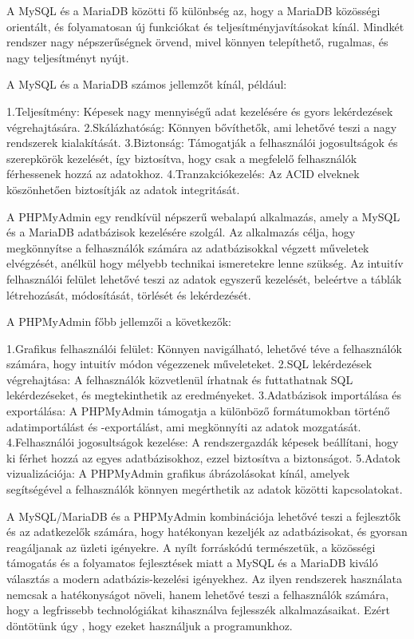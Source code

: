 \documentclass[colorlinks]{thesis-kando}
\theoremstyle{definition}
\theoremstyle{remark}
\begin{document}
A MySQL és a MariaDB közötti fő különbség az, hogy a MariaDB közösségi orientált, és folyamatosan új funkciókat és teljesítményjavításokat kínál. Mindkét rendszer nagy népszerűségnek örvend, mivel könnyen telepíthető, rugalmas, és nagy teljesítményt nyújt.

A MySQL és a MariaDB számos jellemzőt kínál, például:

1.Teljesítmény: Képesek nagy mennyiségű adat kezelésére és gyors lekérdezések végrehajtására.
2.Skálázhatóság: Könnyen bővíthetők, ami lehetővé teszi a nagy rendszerek kialakítását.
3.Biztonság: Támogatják a felhasználói jogosultságok és szerepkörök kezelését, így biztosítva, hogy csak a megfelelő felhasználók férhessenek hozzá az adatokhoz.
4.Tranzakciókezelés: Az ACID elveknek köszönhetően biztosítják az adatok integritását.

A PHPMyAdmin egy rendkívül népszerű webalapú alkalmazás, amely a MySQL és a MariaDB adatbázisok kezelésére szolgál. Az alkalmazás célja, hogy megkönnyítse a felhasználók számára az adatbázisokkal végzett műveletek elvégzését, anélkül hogy mélyebb technikai ismeretekre lenne szükség. Az intuitív felhasználói felület lehetővé teszi az adatok egyszerű kezelését, beleértve a táblák létrehozását, módosítását, törlését és lekérdezését.

A PHPMyAdmin főbb jellemzői a következők:

1.Grafikus felhasználói felület: Könnyen navigálható, lehetővé téve a felhasználók számára, hogy intuitív módon végezzenek műveleteket.
2.SQL lekérdezések végrehajtása: A felhasználók közvetlenül írhatnak és futtathatnak SQL lekérdezéseket, és megtekinthetik az eredményeket.
3.Adatbázisok importálása és exportálása: A PHPMyAdmin támogatja a különböző formátumokban történő adatimportálást és -exportálást, ami megkönnyíti az adatok mozgatását.
4.Felhasználói jogosultságok kezelése: A rendszergazdák képesek beállítani, hogy ki férhet hozzá az egyes adatbázisokhoz, ezzel biztosítva a biztonságot.
5.Adatok vizualizációja: A PHPMyAdmin grafikus ábrázolásokat kínál, amelyek segítségével a felhasználók könnyen megérthetik az adatok közötti kapcsolatokat.

A MySQL/MariaDB és a PHPMyAdmin kombinációja lehetővé teszi a fejlesztők és az adatkezelők számára, hogy hatékonyan kezeljék az adatbázisokat, és gyorsan reagáljanak az üzleti igényekre. A nyílt forráskódú természetük, a közösségi támogatás és a folyamatos fejlesztések miatt a MySQL és a MariaDB kiváló választás a modern adatbázis-kezelési igényekhez. Az ilyen rendszerek használata nemcsak a hatékonyságot növeli, hanem lehetővé teszi a felhasználók számára, hogy a legfrissebb technológiákat kihasználva fejlesszék alkalmazásaikat. Ezért döntötünk úgy , hogy ezeket használjuk a programunkhoz.
\end{document}
